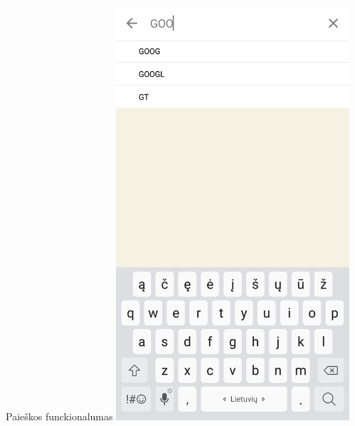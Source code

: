 \documentclass[hyperref={breaklinks=true},fleqn,mathserif]{beamer}
\begin{document}
\begin{frame}
\begin{columns}
\begin{column}{.48\textwidth}
\begin{block}{Paieškos funckionalumas}
					\includegraphics[width=0.65\textwidth]{Pav/stockSearch.png}\centering
				\end{block}
			\end{column}
		\end{columns}
	\end{frame}
\end{document}

